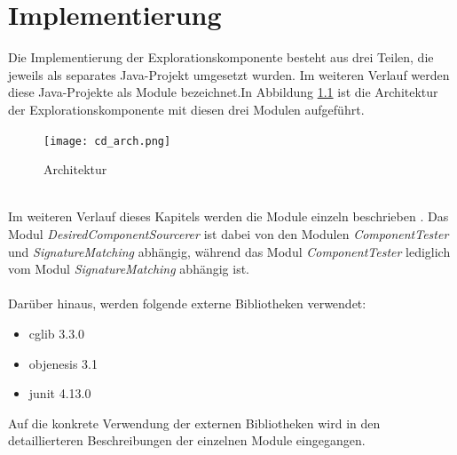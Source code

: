 \chapter{Implementierung}\label{chap_impl}
Die Implementierung der Explorationskomponente besteht aus drei Teilen, die jeweils als separates Java-Projekt umgesetzt wurden. Im weiteren Verlauf werden diese Java-Projekte als \Gls{Modul}e bezeichnet.In Abbildung \ref{cd_arch} ist die Architektur der Explorationskomponente mit diesen drei Modulen aufgeführt.
\begin{figure}[h!]
\centering
\texttt{[image: cd\_arch.png]}
\caption{Architektur}
\label{cd_arch}
\end{figure}
\noindent
\\
Im weiteren Verlauf dieses Kapitels werden die \Gls{Modul}e einzeln beschrieben . Das Modul \emph{DesiredComponentSourcerer} ist dabei von den \Gls{Modul}en \emph{ComponentTester} und \emph{SignatureMatching} abhängig, während das Modul \emph{ComponentTester} lediglich vom Modul \emph{SignatureMatching} abhängig ist.
\\\\
Darüber hinaus, werden folgende externe Bibliotheken verwendet:
\begin{itemize}
\item cglib 3.3.0 \cite{cglib}
\item objenesis 3.1 \cite{objenesis}
\item junit 4.13.0 \cite{junit}
\end{itemize}
Auf die konkrete Verwendung der externen Bibliotheken wird in den detaillierteren Beschreibungen der einzelnen \Gls{Modul}e eingegangen.
